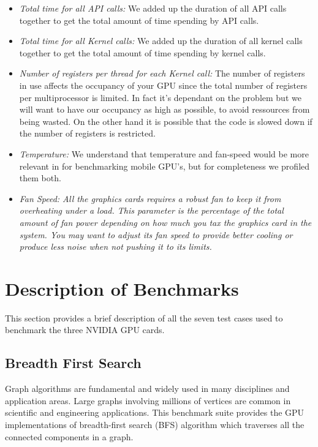 \documentclass[paper=a4, fontsize=11pt]{scrartcl}
\numberwithin{equation}{section}		%
\numberwithin{figure}{section}			%
\numberwithin{table}{section}				%
\begin{document}
\begin{itemize}
\item
\textit{Total time for all API calls: } We added up the duration of all API calls together to get the total amount of time spending by API calls. 

\item
\textit{Total time for all Kernel calls: } We added up the duration of all kernel calls together to get the total amount of time spending by kernel calls. 

\item
\textit{Number of registers per thread for each Kernel call: } The number of registers in use affects the occupancy of your GPU since the total number of registers per multiprocessor is limited. In fact it's dependant on the problem but we will want to have our occupancy as high as possible, to avoid ressources from being wasted. On the other hand it is possible that the code is slowed down if the number of registers is restricted.

\item
\textit{Temperature: } We understand that temperature and fan-speed would be more relevant in for benchmarking mobile GPU's, but for completeness we profiled them both.

\item
\textit{Fan Speed: All the graphics cards requires a robust fan to keep it from overheating under a load. This parameter is the percentage of the total amount of fan power depending on how much you tax the graphics card in the system. You may want to adjust its fan speed to provide better cooling or produce less noise when not pushing it to its limits.}
\end{itemize}



\newpage
\section{Description of Benchmarks}
This section provides a brief description of all the seven test cases used 
to benchmark the three NVIDIA GPU cards.

\subsection{Breadth First Search}
Graph algorithms are fundamental and widely used in many disciplines and application areas. Large graphs involving millions of vertices are common in scientific and engineering applications. This benchmark suite provides the GPU implementations of breadth-first search (BFS) algorithm which traverses all the connected components in a graph.
\end{document}
